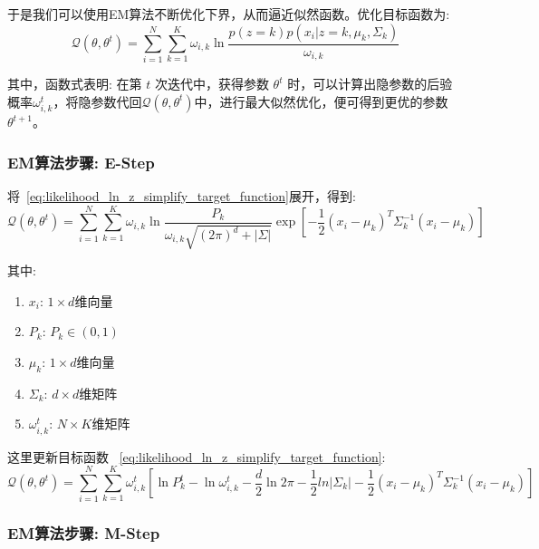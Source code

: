 \documentclass[UTF8]{article} %
\begin{document}
    于是我们可以使用EM算法不断优化下界，从而逼近似然函数。优化目标函数为:
    \begin{equation}
        \mathcal{Q}(\theta, \theta^t) = \sum_{i=1}^N \sum_{k=1}^K \omega_{i,k} \ln \frac{p(z=k) p(x_i|z=k,\mu_k, \Sigma_k)}{\omega_{i,k}} \label{eq:likelihood_ln_z_simplify_target_function}
    \end{equation}

    其中，函数式表明: 在第 $t$ 次迭代中，获得参数 $\theta^t$ 时，可以计算出隐参数的后验概率$\omega_{i,k}^t$，将隐参数代回$\mathcal{Q}(\theta, \theta^t)$中，进行最大似然优化，便可得到更优的参数 $\theta^{t+1}$。

    \subsubsection{EM算法步骤: E-Step}
    将~\eqref{eq:likelihood_ln_z_simplify_target_function}展开，得到:
    \begin{equation}
        \mathcal{Q}(\theta, \theta^t) = \sum_{i=1}^N \sum_{k=1}^K \omega_{i,k} \ln \frac{P_k}{\omega_{i,k} \sqrt{(2\pi)^d + |\Sigma|}} \exp \left[ - \frac{1}{2} (x_i - \mu_k)^T \Sigma_k^{-1} (x_i - \mu_k) \right] \label{eq:likelihood_ln_z_simplify_target_function_expand}
    \end{equation}

    其中:
    \begin{enumerate}
        \item $x_i$: $1 \times d$维向量
        \item $P_k$: $P_k \in (0, 1)$
        \item $\mu_k$: $1 \times d$维向量
        \item $\Sigma_k$: $d \times d$维矩阵
        \item $\omega_{i,k}^t$: $N \times K$维矩阵
    \end{enumerate}
    这里更新目标函数 ~\eqref{eq:likelihood_ln_z_simplify_target_function}:
    \begin{equation}
        \mathcal{Q}(\theta, \theta^t) = \sum_{i=1}^N \sum_{k=1}^K \omega_{i,k}^t \left[ \ln P_k^t - \ln \omega_{i,k}^t - \frac{d}{2} \ln 2\pi - \frac{1}{2} ln |\Sigma_k| - \frac{1}{2} (x_i - \mu_k)^T \Sigma_k^{-1} (x_i - \mu_k) \right] \label{eq:likelihood_ln_z_simplify_target_function_t}
    \end{equation}

    \subsubsection{EM算法步骤: M-Step}
\end{document}
